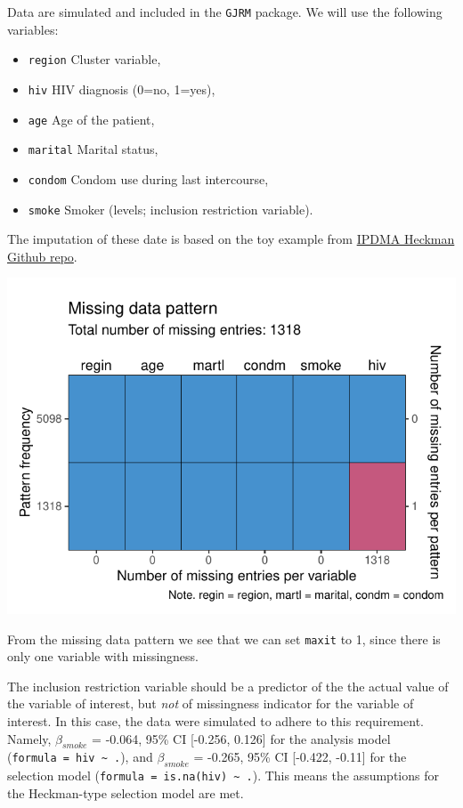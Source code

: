 \documentclass[
]{jss}
\providecommand{\tightlist}{%
  \setlength{\itemsep}{0pt}\setlength{\parskip}{0pt}}
\begin{document}
Data are simulated and included in the \texttt{GJRM} package. We will
use the following variables:

\begin{itemize}
\tightlist
\item
  \texttt{region} Cluster variable,
\item
  \texttt{hiv} HIV diagnosis (0=no, 1=yes),
\item
  \texttt{age} Age of the patient,
\item
  \texttt{marital} Marital status,
\item
  \texttt{condom} Condom use during last intercourse,
\item
  \texttt{smoke} Smoker (levels; inclusion restriction variable).
\end{itemize}

The imputation of these date is based on the toy example from
\href{https://github.com/johamunoz/Heckman-IPDMA/blob/main/Toy_example.R}{IPDMA
Heckman Github repo}.

\begin{CodeChunk}


\begin{center}\includegraphics{Imputation_of_Incomplete_Multilevel_Data_files/figure-latex/hiv-1} \end{center}

\end{CodeChunk}

From the missing data pattern we see that we can set \texttt{maxit} to
1, since there is only one variable with missingness.

The inclusion restriction variable should be a predictor of the the
actual value of the variable of interest, but \emph{not} of missingness
indicator for the variable of interest. In this case, the data were
simulated to adhere to this requirement. Namely, \(\beta_{smoke}\) =
-0.064, 95\% CI {[}-0.256, 0.126{]} for the analysis model
(\texttt{formula\ =\ hiv\ \textasciitilde{}\ .}), and \(\beta_{smoke}\)
= -0.265, 95\% CI {[}-0.422, -0.11{]} for the selection model
(\texttt{formula\ =\ is.na(hiv)\ \textasciitilde{}\ .}). This means the
assumptions for the Heckman-type selection model are met.
\end{document}

